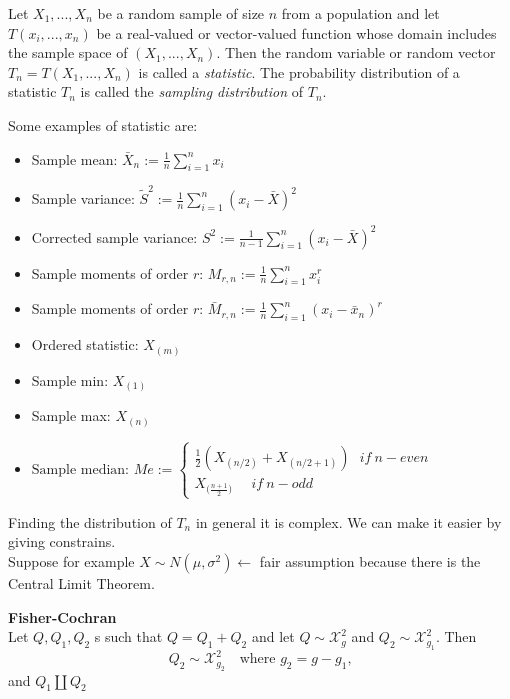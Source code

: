 \begin{defi}
	Let $X_1 , ... , X_n$ be a random sample of size $n$ from a population and let $T(x_i, ... ,x_n)$ be a real-valued or vector-valued function whose domain includes
	the sample space of $(X_1, ... , X_n)$. Then the random variable or random vector
	$T_n = T(X_1, ... ,X_n)$ is called a \textit{statistic}. The probability distribution of a statistic $T_n$	is called the \textit{sampling distribution} of $T_n$.
\end{defi}
Some examples of statistic are:
\begin{itemize}
	\item Sample mean: $\bar X_n:=\frac{1}{n} \sum_{i=1}^n x_i$
	\item Sample variance: $\tilde S^2:=\frac{1}{n} \sum_{i=1}^n (x_i - \bar X )^2 $
	\item Corrected sample variance: $S^2:=\frac{1}{n-1} \sum_{i=1}^n (x_i - \bar X )^2 $
	\item Sample moments of order $r$: $M_{r,n}:=\frac{1}{n}\sum_{i=1}^{n}x_i^r$
	\item Sample moments of order $r$: $\bar M_{r,n}:=\frac{1}{n}\sum_{i=1}^{n}(x_i-\bar x_n)^r$
	\item Ordered statistic: $X_{(m)}$
	\item Sample min: $X_{(1)}$
	\item Sample max: $X_{(n)}$
	\item  
	$
	\text{Sample median:   }	Me:=\begin{cases}
	\frac{1}{2}(X_{(n/2)}+X_{(n/2+1)}) \ \ \ if \ n-even\\
	X_{\big(\frac{n+1}{2}\big)}\ \ \ \ \ \  if \ n-odd
	\end{cases}
	$
\end{itemize}
Finding the distribution of $T_n$ in general it is complex. We can make it easier by giving constrains.\\
Suppose for example $X\sim N(\mu, \sigma^2)\leftarrow$ fair assumption because there is the Central Limit Theorem.
\begin{teo}\textbf{Fisher-Cochran}\\
	\label{teo:fishC}
	Let $Q,Q_1,Q_2$ \rv s such that $Q=Q_1+Q_2$ and let $Q\sim \mathcal{X}_{g}^2$ and $Q_2\sim\mathcal{X}_{g_1}^2$. Then
	$$Q_2\sim \mathcal{X}_{g_2}^2 \ \ \ \text{       where $g_2=g-g_1$,}$$
	and $Q_1 \coprod Q_2$
\end{teo}


